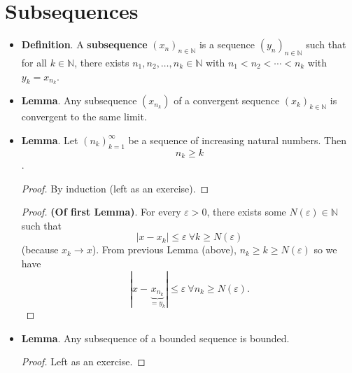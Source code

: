 \documentclass{article}
\newcommand{\N}{\mathbb{N}}
\newcommand{\seq}[2]{(#1_{#2})_{#2 \in \N}}
\newcommand{\?}{\stackrel{?}{=}}
\begin{document}
\section*{Subsequences}

\begin{itemize}
    \item \textbf{Definition}. A \textbf{subsequence} $\seq{x}{n}$ is a sequence $\seq{y}{n}$ such that for all $k \in \N$, there exists $n_1, n_2, \ldots, n_k \in \N$ with $n_1 < n_2 < \cdots < n_k$ with $y_k = x_{n_k}$.
    \item \textbf{Lemma}. Any subsequence $(x_{n_k})$ of a convergent sequence $\seq{x}{k}$ is convergent to the same limit.
    \item \textbf{Lemma}. Let $(n_k)_{k = 1}^{\infty}$ be a sequence of increasing natural numbers. Then
    $$n_k \geq k$$.
    \begin{proof}
        By induction (left as an exercise).
    \end{proof}
    \begin{proof}
        \textbf{(Of first Lemma)}. For every $\varepsilon > 0$, there exists some $N(\varepsilon) \in \N$ such that
        $$|x - x_k| \leq \varepsilon \ \forall k \geq N(\varepsilon)$$
        (because $x_k \rightarrow x$). From previous Lemma (above), $n_k \geq k \geq N(\varepsilon)$ so we have
        $$|x - \underbrace{x_{n_k}}_{ = y_k}| \leq \varepsilon \ \forall n_k \geq N(\varepsilon).$$
    \end{proof}
    \item \textbf{Lemma}. Any subsequence of a bounded sequence is bounded.
    \begin{proof}
        Left as an exercise.
    \end{proof}
\end{itemize}
 
\end{document}
